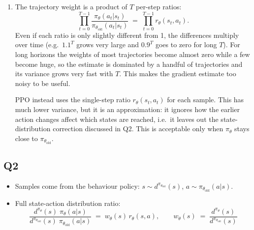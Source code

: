 \documentclass[11pt]{article}
\newcommand{\piold}{\pi_{\theta_{\mathrm{old}}}}
\begin{document}
\begin{enumerate}[label=(\alph*)]
  \item The trajectory weight is a product of $T$ per-step ratios:
        \[
          \prod_{t=0}^{T-1}\frac{\pi_\theta(a_t|s_t)}{\piold(a_t|s_t)}
          \;=\;
          \prod_{t=0}^{T-1} r_{\theta}(s_t, a_t).
        \]
        Even if each ratio is only slightly different from 1, the differences multiply over time
        (e.g.\ $1.1^{T}$ grows very large and $0.9^{T}$ goes to zero for long $T$). For long horizons the
        weights of most trajectories become almost zero while a few become huge, so the estimate is
        dominated by a handful of trajectories and its variance grows very fast with $T$. This makes
        the gradient estimate too noisy to be useful.

        PPO instead uses the single-step ratio $r_\theta(s_t, a_t)$ for each sample. This has much lower
        variance, but it is an approximation: it ignores how the earlier action changes affect which
        states are reached, i.e.\ it leaves out the state-distribution correction discussed in Q2.
        This is acceptable only when $\pi_\theta$ stays close to $\piold$.
\end{enumerate}


\subsection*{Q2}
\begin{itemize}
  \item Samples come from the behaviour policy: $s \sim d^{\piold}(s)$, \; $a \sim \piold(a|s)$.

  \item Full state-action distribution ratio:
        \[
          \frac{d^{\pi_{\theta}}(s)\;\pi_\theta(a|s)}{d^{\piold}(s)\;\piold(a|s)}
          \;=\; w_\theta(s)\,r_{\theta}(s,a),
          \qquad
          w_\theta(s) \;=\; \frac{d^{\pi_\theta}(s)}{d^{\piold}(s)}
        \]
\end{itemize}
\end{document}
